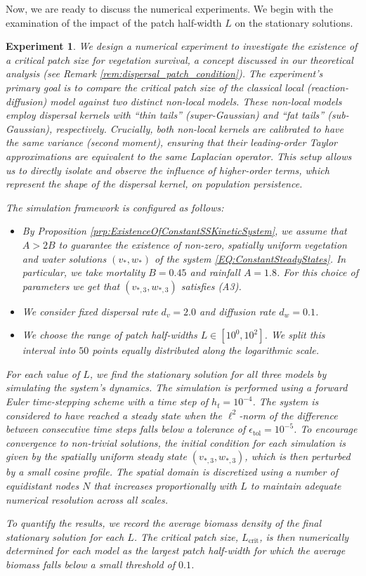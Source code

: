 \documentclass[11pt, a4paper]{article}
\theoremstyle{break}
\theoremstyle{break}
\theoremstyle{break}
\theoremstyle{break}
\theoremstyle{break}
\theoremstyle{break}
\theoremstyle{break}
\theoremstyle{break}
\theoremstyle{break}
\newtheorem{expe}{Experiment}[section]
\theoremstyle{break}
\begin{document}
Now, we are ready to discuss the numerical experiments. We begin with the examination of the impact of the patch half-width $L$ on the stationary solutions.

\begin{expe}
    We design a numerical experiment to investigate the existence of a critical patch size for vegetation survival, a concept discussed in our theoretical analysis (see Remark \ref{rem:dispersal_patch_condition}). The experiment's primary goal is to compare the critical patch size of the classical local (reaction-diffusion) model against two distinct non-local models. These non-local models employ dispersal kernels with ``thin tails'' (super-Gaussian) and ``fat tails'' (sub-Gaussian), respectively. Crucially, both non-local kernels are calibrated to have the same variance (second moment), ensuring that their leading-order Taylor approximations are equivalent to the same Laplacian operator. This setup allows us to directly isolate and observe the influence of higher-order terms, which represent the shape of the dispersal kernel, on population persistence.
    
    The simulation framework is configured as follows:
    \begin{itemize}
        \item By Proposition \ref{prp:ExistenceOfConstantSSKineticSystem}, we assume that $A > 2B$ to guarantee the existence of non-zero, spatially uniform vegetation and water solutions $(v_*, w_*)$ of the system \eqref{EQ:ConstantSteadyStates}. In particular, we take mortality $B = 0.45$ and rainfall $A = 1.8$. For this choice of parameters we get that $(v_{*, 3}, w_{*, 3})$ satisfies (A3).
        \item We consider fixed dispersal rate $d_v = 2.0$ and diffusion rate $d_w = 0.1$.
        \item We choose the range of patch half-widths $L \in [10^{0}, 10^2]$. We split this interval into $50$ points equally distributed along the logarithmic scale.
    \end{itemize}
    For each value of $L$, we find the stationary solution for all three models by simulating the system's dynamics. The simulation is performed using a forward Euler time-stepping scheme with a time step of $h_t = 10^{-4}$. The system is considered to have reached a steady state when the $\ell^2$-norm of the difference between consecutive time steps falls below a tolerance of $\epsilon_{\text{tol}} = 10^{-5}$. To encourage convergence to non-trivial solutions, the initial condition for each simulation is given by the spatially uniform steady state $(v_{*,3}, w_{*,3})$, which is then perturbed by a small cosine profile. The spatial domain is discretized using a number of equidistant nodes $N$ that increases proportionally with $L$ to maintain adequate numerical resolution across all scales.

    To quantify the results, we record the average biomass density of the final stationary solution for each $L$. The critical patch size, $L_{\text{crit}}$, is then numerically determined for each model as the largest patch half-width for which the average biomass falls below a small threshold of $0.1$.
\end{expe}
\end{document}
